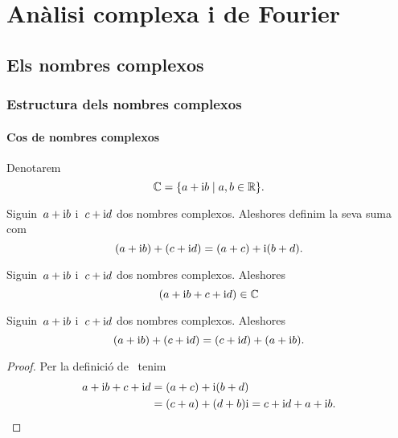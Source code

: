 \documentclass[../Apunts.tex]{subfiles}
\begin{document}
\part{Anàlisi complexa i de Fourier}
\chapter{Els nombres complexos}
\section{Estructura dels nombres complexos}
    \subsection{Cos de nombres complexos}
    \begin{notation}
        \label{notation:cos de nombres complexos}
        Denotarem
        \[\mathbb{C}=\{a+\mathrm{i} b\mid a,b\in\mathbb{R}\}.\]
    \end{notation}
    \begin{definition}
        \label{def:suma de nombres complexos}
        Siguin~\(a+\mathrm{i} b\) i~\(c+\mathrm{i} d\) dos nombres complexos.
        Aleshores definim la seva suma com
        \[(a+\mathrm{i} b)+(c+\mathrm{i} d)=(a+c)+\mathrm{i}(b+d).\]
    \end{definition}
    \begin{observation}
        \label{obs:els nombres complexos estan tancats per la suma}
        Siguin~\(a+\mathrm{i} b\) i~\(c+\mathrm{i} d\) dos nombres complexos.
        Aleshores
        \[(a+\mathrm{i} b+c+\mathrm{i} d)\in\mathbb{C}\]
    \end{observation}
    \begin{proposition}
        \label{prop:els nombres complexos commuten per la suma}
        \label{prop:el producte de nombres complexos és commutatiu}
        Siguin~\(a+\mathrm{i} b\) i~\(c+\mathrm{i} d\) dos nombres complexos.
        Aleshores
        \[(a+\mathrm{i} b)+(c+\mathrm{i} d)=(c+\mathrm{i} d)+(a+\mathrm{i} b).\]
    \end{proposition}
    \begin{proof}
        Per la definició de~ tenim
        \begin{align*}
            a+\mathrm{i} b+c+\mathrm{i} d&=(a+c)+\mathrm{i}(b+d) \\
            &=(c+a)+(d+b)\mathrm{i}=c+\mathrm{i} d+a+\mathrm{i} b.\qedhere
        \end{align*}
    \end{proof}
\end{document}
